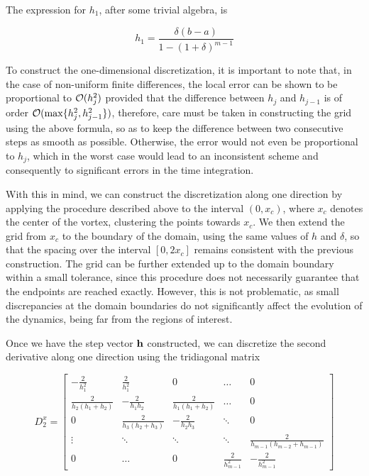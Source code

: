 The expression for $h_1$, after some trivial algebra, is

\[ h_1 = \frac{\delta(b - a)}{1 - (1 + \delta)^{m - 1}} \]

To construct the one-dimensional discretization, it is important to note that, in the case of non-uniform finite differences, the local error can be shown to be proportional to $\mathcal{O}(h_j^2)$ provided that the difference between $h_j$ and $h_{j-1}$ is of order $\mathcal{O}(\max\{h_j^2, h_{j-1}^2\})$, therefore, care must be taken in constructing the grid using the above formula, so as to keep the difference between two consecutive steps as smooth as possible. Otherwise, the error would not even be proportional to $h_j$, which in the worst case would lead to an inconsistent scheme and consequently to significant errors in the time integration.

With this in mind, we can construct the discretization along one direction by applying the procedure described above to the interval $(0, x_c)$, where $x_c$ denotes the center of the vortex, clustering the points towards $x_c$.  
We then extend the grid from $x_c$ to the boundary of the domain, using the same values of $h$ and $\delta$, so that the spacing over the interval $[0, 2x_c]$ remains consistent with the previous construction.  
The grid can be further extended up to the domain boundary within a small tolerance, since this procedure does not necessarily guarantee that the endpoints are reached exactly.  
However, this is not problematic, as small discrepancies at the domain boundaries do not significantly affect the evolution of the dynamics, being far from the regions of interest.

Once we have the step vector $\mathbf{h}$ constructed, we can discretize the second derivative along one direction using the tridiagonal matrix

\[
    D_2^x =
    \begin{bmatrix}
        -\frac{2}{h_1^2} & \frac{2}{h_1^2} & 0 & \dots & 0 \\
        \frac{2}{h_2(h_1+h_2)} & -\frac{2}{h_1 h_2} & \frac{2}{h_1(h_1+h_2)} & \dots & 0 \\
        0 & \frac{2}{h_3(h_2+h_3)} & -\frac{2}{h_2 h_3} & \ddots & 0 \\
        \vdots & \ddots & \ddots & \ddots & \frac{2}{h_{m-1}(h_{m-2}+h_{m-1})} \\
        0 & \dots & 0 & \frac{2}{h_{m-1}^2} & -\frac{2}{h_{m-1}^2}
    \end{bmatrix}
\]

